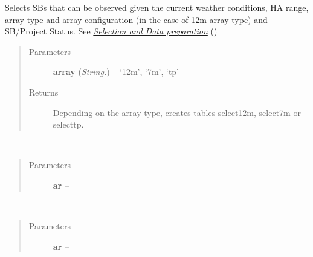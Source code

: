 \documentclass[a4paper,10pt,english]{sphinxmanual}
\begin{document}
\begin{fulllineitems}
\begin{fulllineitems}
\begin{quote}
\begin{description}
\end{description}\end{quote}

\end{fulllineitems}


\begin{fulllineitems}
\label{wtoapi:wtoAlgorithm.WtoAlgorithm.selector}
Selects SBs that can be observed given the current weather conditions,
HA range, array type and array configuration (in the case of 12m array
type) and SB/Project Status. See
{\hyperref[algorithm:selection]{\emph{Selection and Data preparation}}} ()
\begin{quote}\begin{description}
\item[{Parameters}] \leavevmode
\textbf{array} (\emph{String.}) -- `12m', `7m', `tp'

\item[{Returns}] \leavevmode
Depending on the array type, creates tables select12m, select7m
or selecttp.

\end{description}\end{quote}

\end{fulllineitems}


\begin{fulllineitems}
\label{wtoapi:wtoAlgorithm.WtoAlgorithm.set_array_ar}~\begin{quote}\begin{description}
\item[{Parameters}] \leavevmode
\textbf{ar} -- 

\end{description}\end{quote}

\end{fulllineitems}


\begin{fulllineitems}
\label{wtoapi:wtoAlgorithm.WtoAlgorithm.set_arrayar}~\begin{quote}\begin{description}
\item[{Parameters}] \leavevmode
\textbf{ar} -- 


\end{description}
\end{quote}
\end{fulllineitems}
\end{fulllineitems}
\end{document}

